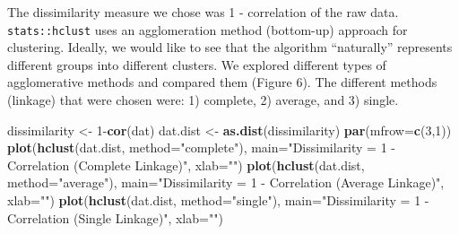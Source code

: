 \documentclass[]{article}
\newenvironment{Shaded}{\begin{snugshade}}{\end{snugshade}}
\newcommand{\KeywordTok}[1]{\textcolor[rgb]{0.13,0.29,0.53}{\textbf{{#1}}}}
\newcommand{\DataTypeTok}[1]{\textcolor[rgb]{0.13,0.29,0.53}{{#1}}}
\newcommand{\DecValTok}[1]{\textcolor[rgb]{0.00,0.00,0.81}{{#1}}}
\newcommand{\StringTok}[1]{\textcolor[rgb]{0.31,0.60,0.02}{{#1}}}
\newcommand{\NormalTok}[1]{{#1}}
\begin{document}
The dissimilarity measure we chose was 1 - correlation of the raw data.
\texttt{stats::hclust} uses an agglomeration method (bottom-up) approach
for clustering. Ideally, we would like to see that the algorithm
``naturally'' represents different groups into different clusters. We
explored different types of agglomerative methods and compared them
(Figure 6). The different methods (linkage) that were chosen were: 1)
complete, 2) average, and 3) single.

\begin{Shaded}
\begin{Highlighting}[]
\NormalTok{dissimilarity <-}\StringTok{ }\DecValTok{1}\NormalTok{-}\KeywordTok{cor}\NormalTok{(dat)}
\NormalTok{dat.dist <-}\StringTok{ }\KeywordTok{as.dist}\NormalTok{(dissimilarity)}
\KeywordTok{par}\NormalTok{(}\DataTypeTok{mfrow=}\KeywordTok{c}\NormalTok{(}\DecValTok{3}\NormalTok{,}\DecValTok{1}\NormalTok{))}
\KeywordTok{plot}\NormalTok{(}\KeywordTok{hclust}\NormalTok{(dat.dist, }\DataTypeTok{method=}\StringTok{"complete"}\NormalTok{),}
     \DataTypeTok{main=}\StringTok{"Dissimilarity = 1 - Correlation (Complete Linkage)"}\NormalTok{, }\DataTypeTok{xlab=}\StringTok{""}\NormalTok{)}
\KeywordTok{plot}\NormalTok{(}\KeywordTok{hclust}\NormalTok{(dat.dist, }\DataTypeTok{method=}\StringTok{"average"}\NormalTok{),}
     \DataTypeTok{main=}\StringTok{"Dissimilarity = 1 - Correlation (Average Linkage)"}\NormalTok{, }\DataTypeTok{xlab=}\StringTok{""}\NormalTok{)}
\KeywordTok{plot}\NormalTok{(}\KeywordTok{hclust}\NormalTok{(dat.dist, }\DataTypeTok{method=}\StringTok{"single"}\NormalTok{),}
     \DataTypeTok{main=}\StringTok{"Dissimilarity = 1 - Correlation (Single Linkage)"}\NormalTok{, }\DataTypeTok{xlab=}\StringTok{""}\NormalTok{)}
\end{Highlighting}
\end{Shaded}
\end{document}
